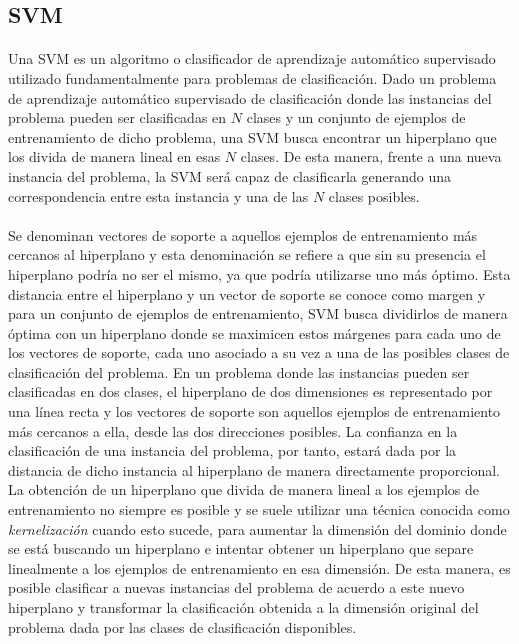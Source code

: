 \subsection{SVM}

\paragraph{}Una SVM es un algoritmo o clasificador de aprendizaje automático supervisado utilizado fundamentalmente para problemas de clasificación.
Dado un problema de aprendizaje automático supervisado de clasificación donde las instancias del problema pueden ser clasificadas en $N$ clases y un conjunto de ejemplos de entrenamiento de dicho problema, una SVM busca encontrar un hiperplano que los divida de manera lineal en esas $N$ clases. De esta manera, frente a una nueva instancia del problema, la SVM será capaz de clasificarla generando una correspondencia entre esta instancia y una de las $N$ clases posibles.

\paragraph{}Se denominan vectores de soporte a aquellos ejemplos de entrenamiento más cercanos al hiperplano y esta denominación se refiere a que sin su presencia el hiperplano podría no ser el mismo, ya que podría utilizarse uno más óptimo. Esta distancia entre el hiperplano y un vector de soporte se conoce como margen y para un conjunto de ejemplos de entrenamiento, SVM busca dividirlos de manera óptima con un hiperplano donde se maximicen estos márgenes para cada uno de los vectores de soporte, cada uno asociado a su vez a una de las posibles clases de clasificación del problema.
En un problema donde las instancias pueden ser clasificadas en dos clases, el hiperplano de dos dimensiones es representado por una línea recta y los vectores de soporte son aquellos ejemplos de entrenamiento más cercanos a ella, desde las dos direcciones posibles. La confianza en la clasificación de una instancia del problema, por tanto, estará dada por la distancia de dicho instancia al hiperplano de manera directamente proporcional.
La obtención de un hiperplano que divida de manera lineal a los ejemplos de entrenamiento no siempre es posible y se suele utilizar una técnica conocida como \textit{kernelización} cuando esto sucede, para aumentar la dimensión del dominio donde se está buscando un hiperplano e intentar obtener un hiperplano que separe linealmente a los ejemplos de entrenamiento en esa dimensión. De esta manera, es posible clasificar a nuevas instancias del problema de acuerdo a este nuevo hiperplano y transformar la clasificación obtenida a la dimensión original del problema dada por las clases de clasificación disponibles.

